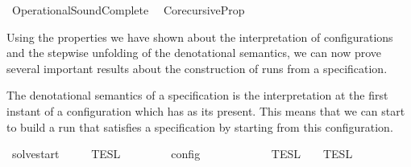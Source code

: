 %
\begin{isabellebody}%
%
%
\isadelimdocument
%
\endisadelimdocument
%
\isatagdocument
%
\isamarkuptrue%
%
\endisatagdocument
{\isafolddocument}%
%
\isadelimdocument
%
\endisadelimdocument
%
\isadelimtheory
%
\endisadelimtheory
%
\isatagtheory
{}\isamarkupfalse%
\ Operational{\isacharunderscore}SoundComplete\isanewline
{}\isanewline
\ \ Corecursive{\isacharunderscore}Prop\isanewline
\isanewline
{}%
\endisatagtheory
{\isafoldtheory}%
%
\isadelimtheory
%
\endisadelimtheory
%
\begin{isamarkuptext}%
Using the properties we have shown about the interpretation of configurations 
  and the stepwise unfolding of the denotational semantics, we can now prove 
  several important results about the construction of runs from a specification.%
\end{isamarkuptext}\isamarkuptrue%
%
\isadelimdocument
%
\endisadelimdocument
%
\isatagdocument
%
\isamarkuptrue%
%
\endisatagdocument
{\isafolddocument}%
%
\isadelimdocument
%
\endisadelimdocument
%
\begin{isamarkuptext}%
The denotational semantics of a specification \isa{{\isasymPsi}} is the interpretation 
  at the first instant of a configuration which has \isa{{\isasymPsi}} as its present.
  This means that we can start to build a run that satisfies a specification by 
  starting from this configuration.%
\end{isamarkuptext}\isamarkuptrue%
\isamarkupfalse%
\ solve{\isacharunderscore}start{\isacharcolon}\isanewline
\ \ \ {\isacartoucheopen}{\isasymlbrakk}{\isasymlbrakk}\ {\isasymPsi}\ {\isasymrbrakk}{\isasymrbrakk}\isactrlsub T\isactrlsub E\isactrlsub S\isactrlsub L\ {\isacharequal}\ {\isasymlbrakk}\ {\isacharbrackleft}{\isacharbrackright}{\isacharcomma}\ {}\ {\isasymturnstile}\ {\isasymPsi}\ {\isasymtriangleright}\ {\isacharbrackleft}{\isacharbrackright}\ {\isasymrbrakk}\isactrlsub c\isactrlsub o\isactrlsub n\isactrlsub f\isactrlsub i\isactrlsub g{\isacartoucheclose}\isanewline
%
\isadelimproof
\ \ %
\endisadelimproof
%
\isatagproof
{}\isamarkupfalse%
\ {\isacharminus}\isanewline
\ \ \ \ \isamarkupfalse%
\ {\isacartoucheopen}{\isasymlbrakk}{\isasymlbrakk}\ {\isasymPsi}\ {\isasymrbrakk}{\isasymrbrakk}\isactrlsub T\isactrlsub E\isactrlsub S\isactrlsub L\ {\isacharequal}\ {\isasymlbrakk}{\isasymlbrakk}\ {\isasymPsi}\ {\isasymrbrakk}{\isasymrbrakk}\isactrlsub T\isactrlsub E\isactrlsub S\isactrlsub L\isactrlbsup {\isasymge}\ {}\isactrlesup {\isacartoucheclose}\isanewline

\end{isabellebody}
